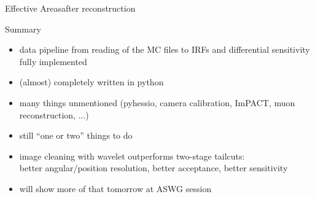 \documentclass[8pt]{beamer}
\begin{document}
%
%
%         
%
%
%
%         
%


    \begin{frame}{Effective Areas}{after reconstruction}
        \centering
        \setlength{\figureheight}{7cm}
        \setlength{\figurewidth}{.75\textwidth}
        

    \end{frame}




    \begin{frame}{Summary}
        \begin{itemize}
            \item data pipeline from reading of the MC files to IRFs and differential
                sensitivity fully implemented
            \item (almost) completely written in python
            \item many things unmentioned (pyhessio, camera calibration, ImPACT,
                muon reconstruction, ...)
            \item still ``one or two'' things to do

            \bigskip
            \item image cleaning with wavelet outperforms two-stage tailcuts:\\
                better angular/position resolution, better acceptance, better sensitivity
            \item will show more of that tomorrow at ASWG session

        \end{itemize}

    \end{frame}



\end{document}
